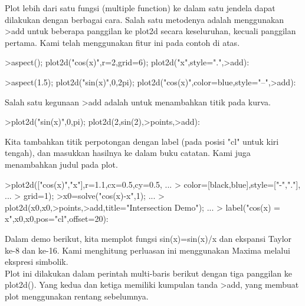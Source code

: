 \begin{eulernotebook}
\begin{eulercomment}
Plot lebih dari satu fungsi (multiple function) ke dalam satu jendela
dapat dilakukan dengan berbagai cara. Salah satu metodenya adalah
menggunakan \textgreater{}add untuk beberapa panggilan ke plot2d secara
keseluruhan, kecuali panggilan pertama. Kami telah menggunakan fitur
ini pada contoh di atas.
\end{eulercomment}
\begin{eulerprompt}
>aspect(); plot2d("cos(x)",r=2,grid=6); plot2d("x",style=".",>add):
\end{eulerprompt}
\begin{eulerprompt}
>aspect(1.5); plot2d("sin(x)",0,2pi); plot2d("cos(x)",color=blue,style="--",>add):
\end{eulerprompt}
\begin{eulercomment}
Salah satu kegunaan \textgreater{}add adalah untuk menambahkan titik pada kurva.
\end{eulercomment}
\begin{eulerprompt}
>plot2d("sin(x)",0,pi); plot2d(2,sin(2),>points,>add):
\end{eulerprompt}
\begin{eulercomment}
Kita tambahkan titik perpotongan dengan label (pada posisi "cl" untuk
kiri tengah), dan masukkan hasilnya ke dalam buku catatan. Kami juga
menambahkan judul pada plot.
\end{eulercomment}
\begin{eulerprompt}
>plot2d(["cos(x)","x"],r=1.1,cx=0.5,cy=0.5, ...
>  color=[black,blue],style=["-","."], ...
>  grid=1);
>x0=solve("cos(x)-x",1);  ...
>  plot2d(x0,x0,>points,>add,title="Intersection Demo");  ...
>  label("cos(x) = x",x0,x0,pos="cl",offset=20):
\end{eulerprompt}
\begin{eulercomment}
Dalam demo berikut, kita memplot fungsi sin(x)=sin(x)/x dan ekspansi
Taylor ke-8 dan ke-16. Kami menghitung perluasan ini menggunakan
Maxima melalui ekspresi simbolik.\\
Plot ini dilakukan dalam perintah multi-baris berikut dengan tiga
panggilan ke plot2d(). Yang kedua dan ketiga memiliki kumpulan tanda
\textgreater{}add, yang membuat plot menggunakan rentang sebelumnya.


\end{eulercomment}
\end{eulernotebook}
